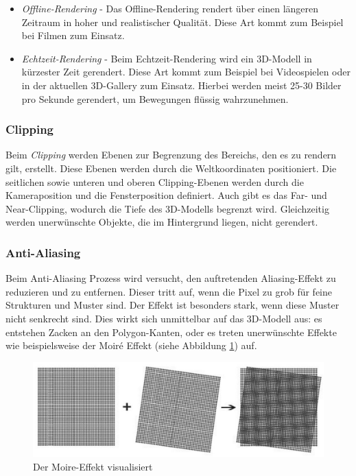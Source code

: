 \begin{itemize}
    \item \emph{Offline-Rendering} - Das Offline-Rendering rendert über einen längeren Zeitraum in hoher und realistischer Qualität. Diese Art kommt zum Beispiel bei Filmen zum Einsatz. \cite{RenderArten}
    \item \emph{Echtzeit-Rendering} - Beim Echtzeit-Rendering wird ein 3D-Modell in kürzester Zeit gerendert. Diese Art kommt zum Beispiel bei Videospielen oder in der aktuellen 3D-Gallery zum Einsatz. Hierbei werden meist 25-30 Bilder pro Sekunde gerendert, um Bewegungen flüssig wahrzunehmen. \cite{RenderArten}
\end{itemize}


\subsubsection{Clipping}
\label{clipping}
Beim \emph{Clipping} werden Ebenen zur Begrenzung des Bereichs, den es zu rendern gilt, erstellt. Diese Ebenen werden durch die Weltkoordinaten positioniert. Die seitlichen sowie unteren und oberen Clipping-Ebenen werden durch die Kameraposition und die Fensterposition definiert. Auch gibt es das Far- und Near-Clipping, wodurch die Tiefe des 3D-Modells begrenzt wird. Gleichzeitig werden unerwünschte Objekte, die im Hintergrund liegen, nicht gerendert. \cite{Rendering3DModels}


\subsubsection{Anti-Aliasing}
Beim Anti-Aliasing Prozess wird versucht, den auftretenden Aliasing-Effekt zu reduzieren und zu entfernen. Dieser tritt auf, wenn die Pixel zu grob für feine Strukturen und Muster sind. Der Effekt ist besonders stark, wenn diese Muster nicht senkrecht sind. Dies wirkt sich unmittelbar auf das 3D-Modell aus: es entstehen Zacken an den Polygon-Kanten, oder es treten unerwünschte Effekte wie beispielsweise der Moiré Effekt (siehe Abbildung \ref{fig:impl:MoireEffekt}) auf. 
\cite{Rendering3DModels} 
\begin{figure}
    \centering
    \includegraphics[scale=0.3]{pics/moire-effekt.jpg}
    \caption{Der Moire-Effekt visualisiert \cite{MoireEffekt}}
    \label{fig:impl:MoireEffekt}
\end{figure}


